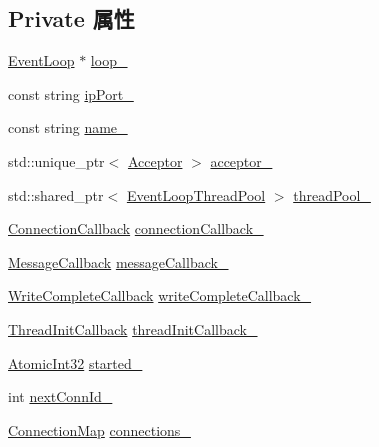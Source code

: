 \subsection*{Private 属性}
\begin{DoxyCompactItemize}
\item 
\hyperlink{classmuduo_1_1net_1_1EventLoop}{Event\+Loop} $\ast$ \hyperlink{classmuduo_1_1net_1_1TcpServer_a19968f50018d32ac31f5cba0195591ac}{loop\+\_\+}
\item 
const string \hyperlink{classmuduo_1_1net_1_1TcpServer_ac2003caaab30c05c0b8024b9bc47eced}{ip\+Port\+\_\+}
\item 
const string \hyperlink{classmuduo_1_1net_1_1TcpServer_a957ab180ea6fccb9f64da8218db44728}{name\+\_\+}
\item 
std\+::unique\+\_\+ptr$<$ \hyperlink{classmuduo_1_1Acceptor}{Acceptor} $>$ \hyperlink{classmuduo_1_1net_1_1TcpServer_a5bcd0fdcb44f68a3f9de09479ff98d14}{acceptor\+\_\+}
\item 
std\+::shared\+\_\+ptr$<$ \hyperlink{classmuduo_1_1net_1_1EventLoopThreadPool}{Event\+Loop\+Thread\+Pool} $>$ \hyperlink{classmuduo_1_1net_1_1TcpServer_ac65afd88f02d76fd2dff766d664746db}{thread\+Pool\+\_\+}
\item 
\hyperlink{namespacemuduo_1_1net_a78754792e997a13cb10908eb7ec508b2}{Connection\+Callback} \hyperlink{classmuduo_1_1net_1_1TcpServer_ae4ac7fea1abbcfb56d481dbe8ffb37e7}{connection\+Callback\+\_\+}
\item 
\hyperlink{namespacemuduo_1_1net_acaa802028467a41738aeb49699e85285}{Message\+Callback} \hyperlink{classmuduo_1_1net_1_1TcpServer_aa4d5ea21d215329779698e634e5e7755}{message\+Callback\+\_\+}
\item 
\hyperlink{namespacemuduo_1_1net_a525c3730bfefb763975b035ebc88a63d}{Write\+Complete\+Callback} \hyperlink{classmuduo_1_1net_1_1TcpServer_a525f0d11cfa2e271600caa30407b6150}{write\+Complete\+Callback\+\_\+}
\item 
\hyperlink{classmuduo_1_1net_1_1TcpServer_a4665880f4633f1e7d95fd6fef6811717}{Thread\+Init\+Callback} \hyperlink{classmuduo_1_1net_1_1TcpServer_a11944ce8f1ee9c35aca3f95e11942b4b}{thread\+Init\+Callback\+\_\+}
\item 
\hyperlink{namespacemuduo_a5ff4a046f03836ad4fb080652d419987}{Atomic\+Int32} \hyperlink{classmuduo_1_1net_1_1TcpServer_abc692d80e6695627c30dfbd1a05d9843}{started\+\_\+}
\item 
int \hyperlink{classmuduo_1_1net_1_1TcpServer_aab950be51cdd74cb0fc104fa135e4853}{next\+Conn\+Id\+\_\+}
\item 
\hyperlink{classmuduo_1_1net_1_1TcpServer_a2c3bfe5c78908785dcee50683b157116}{Connection\+Map} \hyperlink{classmuduo_1_1net_1_1TcpServer_a07322e7616e616baff3de1675028979a}{connections\+\_\+}
\end{DoxyCompactItemize}



